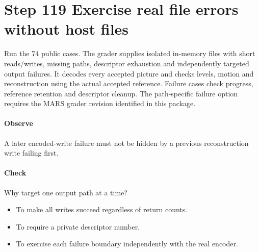 \section{Step 119 Exercise real file errors without host files}\label{h263-clip-s09}
Run the 74 public cases. The grader supplies isolated in-memory files with short
reads/writes, missing paths, descriptor exhaustion and independently targeted
output failures. It decodes every accepted picture and checks levels, motion and
reconstruction using the actual accepted reference. Failure cases check progress,
reference retention and descriptor cleanup. The path-specific failure option
requires the MARS grader revision identified in this package.

\paragraph{Observe} A later encoded-write failure must not be hidden by a previous reconstruction write failing first.
\paragraph{Check} Why target one output path at a time?
\begin{itemize}
  \item[A.] To make all writes succeed regardless of return counts.
  \item[B.] To require a private descriptor number.
  \item[C.] To exercise each failure boundary independently with the real encoder.
\end{itemize}

